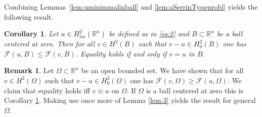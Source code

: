 \documentclass[twoside,11pt]{article}
\newtheorem{corollary}{Corollary}
\theoremstyle{definition}
\newtheorem{remark}{Remark}
\begin{document}

Combining Lemmas~\ref{lem:uminimmalinball} and \ref{lem:aSerrinTypeprobl}
yields the following result.  
\begin{corollary}\label{ref:cor1}
    Let $u\in H^2_{loc}(\mathbb{R}^n)$ be defined as in \eqref{eq:2} and  $B \subset \mathbb{R}^n$ be a ball centered at zero. Then for all $v \in H^2(B)$ such that $v- u \in H_0^2(B)$ one has $\mathcal{F}(u,B) \leq \mathcal{F}(v,B)$. Equality holds if and only if $v = u$ in $B$. 
\end{corollary}






\begin{remark}
    Let $\Omega \subset \mathbb{R}^n$ be an open bounded set. We have shown that for all $v \in H^2(\Omega)$ such that $v-u \in H_0^2(\Omega)$ one has $\mathcal{F}(v,\Omega) \geq \mathcal{F}(u,\Omega)$. We claim that equality holds iff $v \equiv u$ on $\Omega$.  If $\Omega$ is a ball centered at zero this is Corollary \ref{ref:cor1}. Making use once more of Lemma \ref{lem:3}
    yields the result for general $\Omega$.
\end{remark}
\end{document}

